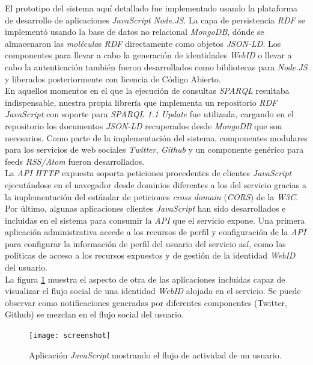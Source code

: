 El prototipo del sistema aqu\'i detallado fue implementado usando la plataforma de desarrollo de aplicaciones \textit{JavaScript} \textit{Node.JS}. La capa de persistencia \textit{RDF} se implement\'o usando la base de datos no relacional \textit{MongoDB}, d\'onde se almacenaron las \textit{mol\'ecula}s \textit{RDF} directamente como objetos \textit{JSON-LD}. Los componentes para llevar a cabo la generaci\'on de identidades \textit{WebID} o llevar a cabo la autenticaci\'on tambi\'en fueron desarrollados como bibliotecas para \textit{Node.JS} y liberados posteriormente con licencia de C\'odigo Abierto.\\
En aquellos momentos en el que la ejecuci\'on de consultas \textit{SPARQL} resultaba indispensable, nuestra propia librer\'ia que implementa un repositorio \textit{RDF} \textit{JavaScript} con soporte para \textit{SPARQL 1.1 Update} fue utilizada, cargando en el repositorio los documentos \textit{JSON-LD} recuperados desde \textit{MongoDB} que son necesarios.
Como parte de la implementaci\'on del sistema, componentes modulares para los servicios de web sociales \textit{Twitter}, \textit{Github} y un componente gen\'erico para feeds \textit{RSS/Atom} fueron desarrollados.\\
La \textit{API} \textit{HTTP} expuesta soporta peticiones procedentes de clientes \textit{JavaScript} ejecut\'andose en el navegador desde dominios diferentes a los del servicio gracias a la implementaci\'on del est\'andar de peticiones \textit{cross domain} (\textit{CORS}) \cite{cors} de la \textit{W3C}.\\
Por \'ultimo, algunas aplicaciones clientes \textit{JavaScript} han sido desarrollados e incluidas en el sistema para consumir la \textit{API} que el servicio expone. Una primera aplicaci\'on administrativa accede a los recursos de perfil y configuraci\'on de la \textit{API} para configurar la informaci\'on de perfil del usuario del servicio as\'i, como las pol\'iticas de acceso a los recursos expuestos y de gesti\'on de la identidad \textit{WebID} del usuario.\\
La figura \ref{figura6} muestra el aspecto de otra de las aplicaciones incluidas capaz de visualizar el flujo social de una identidad \textit{WebID} alojada en el servicio. Se puede observar como notificaciones generadas por diferentes componentes (Twitter, Github) se mezclan en el flujo social del usuario. \\

\begin{figure}
\vspace{2.4in}
\centering
\caption{Aplicaci\'on \textit{JavaScript} mostrando el flujo de actividad de un usuario.}
\vspace{5mm}
\texttt{[image: screenshot]}
\label{figura6}
\end{figure}


